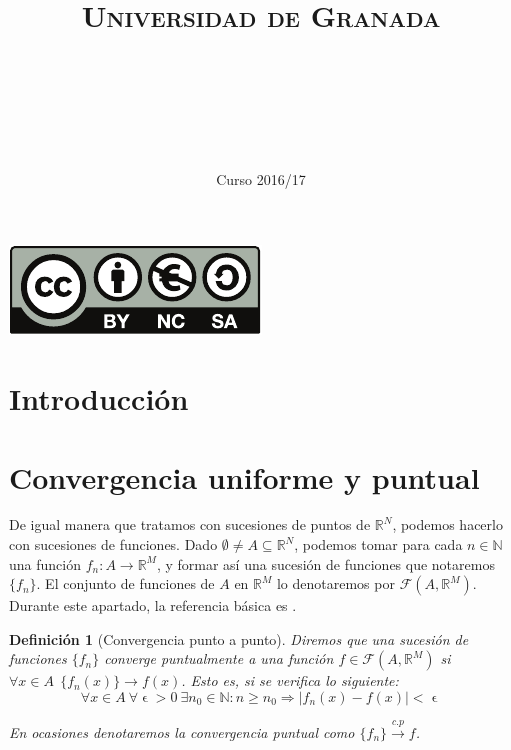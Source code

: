 \documentclass[11pt, a4paper]{article}
\title{
  \normalfont \normalsize 
  \textsc{Universidad de Granada} \\ [25pt]    %
  \horrule{0.5pt} \\[0.4cm] %
  \huge \sffamily\subject\\ %
  \horrule{2pt} \\[0.5cm] %
}
\author{\Large\sffamily{\docauthor}}
\date{\vspace{-1.5em} \normalsize \sffamily Curso 2016/17}
\newif\IfInSansMode
\let\epsilon\upvarepsilon
\newcommand{\R}{\mathbb{R}} \newcommand{\N}{\mathbb{N}}
\newcommand{\fn}{\{f_n\}}
\theoremstyle{theorem-style}
\theoremstyle{definition-style}
\newtheorem{ndef}{Definición}[section]
\theoremstyle{remark-style}
\theoremstyle{example-style}
\begin{document}
\maketitle  %
\vfill
\begin{center}
  \includegraphics{by-nc-sa.pdf}  %
\end{center}
\newpage
\tableofcontents    %
\newpage



\section*{Introducción}


\newpage


\section{Convergencia uniforme y puntual}
De igual manera que tratamos con sucesiones de puntos de $\R^N$, podemos hacerlo con sucesiones de funciones. Dado $\emptyset \ne A \subseteq \R^N$, podemos tomar para cada $n \in \mathbb{N}$ una función $f_n : A \to \R^M$, y formar así una sucesión de funciones que notaremos $\{f_n\}$. El conjunto de funciones de $A$ en $\mathbb{R}^M$ lo denotaremos por $\mathcal{F}(A,\mathbb{R}^M)$. Durante este apartado, la referencia básica es \cite[Capítulo 5]{marsden}.

\begin{ndef}[Convergencia punto a punto] Diremos que una sucesión de funciones $\fn$ converge puntualmente a una función $f\in \mathcal{F}(A,\mathbb{R}^M)$ si $\forall x \in A \ \ \{f_n(x)\} \rightarrow f(x)$. Esto es, si se verifica lo siguiente:
  \[
    \forall x\in A\ \forall \epsilon > 0\ \exists n_0 \in \mathbb{N}: n \ge n_0 \Rightarrow |f_n(x)-f(x)| < \epsilon 
  \]
  
  En ocasiones denotaremos la convergencia puntual como $\fn \xrightarrow {c.p} f$. 
\end{ndef}
\end{document}
